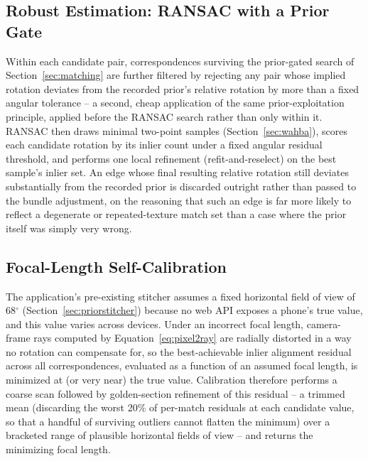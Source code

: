 \documentclass[11pt]{article}
\newcommand{\Deg}{\ensuremath{^{\circ}}}
\begin{document}
\subsection{Robust Estimation: RANSAC with a Prior Gate}

Within each candidate pair, correspondences surviving the prior-gated search of Section~\ref{sec:matching} are further filtered by rejecting any pair whose implied rotation deviates from the recorded prior's relative rotation by more than a fixed angular tolerance -- a second, cheap application of the same prior-exploitation principle, applied before the RANSAC search rather than only within it. RANSAC then draws minimal two-point samples (Section~\ref{sec:wahba}), scores each candidate rotation by its inlier count under a fixed angular residual threshold, and performs one local refinement (refit-and-reselect) on the best sample's inlier set. An edge whose final resulting relative rotation still deviates substantially from the recorded prior is discarded outright rather than passed to the bundle adjustment, on the reasoning that such an edge is far more likely to reflect a degenerate or repeated-texture match set than a case where the prior itself was simply very wrong.

\subsection{Focal-Length Self-Calibration}
\label{sec:calib}

The application's pre-existing stitcher assumes a fixed horizontal field of view of $68\Deg$ (Section~\ref{sec:priorstitcher}) because no web API exposes a phone's true value, and this value varies across devices. Under an incorrect focal length, camera-frame rays computed by Equation~\eqref{eq:pixel2ray} are radially distorted in a way no rotation can compensate for, so the best-achievable inlier alignment residual across all correspondences, evaluated as a function of an assumed focal length, is minimized at (or very near) the true value. Calibration therefore performs a coarse scan followed by golden-section refinement of this residual -- a trimmed mean (discarding the worst 20\% of per-match residuals at each candidate value, so that a handful of surviving outliers cannot flatten the minimum) over a bracketed range of plausible horizontal fields of view -- and returns the minimizing focal length.
\end{document}

